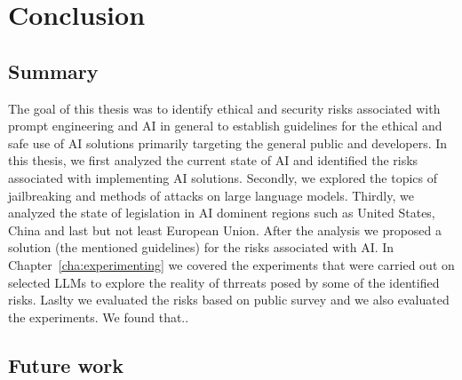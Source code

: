 \chapter{Conclusion}


\section{Summary}

The goal of this thesis was to identify ethical and security risks associated with prompt engineering and AI in general to establish guidelines for the ethical and safe use of AI solutions primarily targeting the general public and developers. In this thesis, we first analyzed the current state of AI and identified the risks associated with implementing AI solutions. Secondly, we explored the topics of jailbreaking and methods of attacks on large language models. Thirdly, we analyzed the state of legislation in AI dominent regions such as United States, China and last but not least European Union. After the analysis we proposed a solution (the mentioned guidelines) for the risks associated with AI. In Chapter~\ref{cha:experimenting} we covered the experiments that were carried out on selected LLMs to explore the reality of thrreats posed by some of the identified risks. Laslty we evaluated the risks based on public survey and we also evaluated the experiments. We found that..


\section{Future work}


